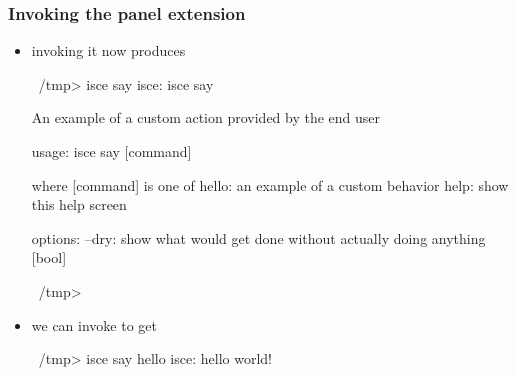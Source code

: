 \begin{frame}[fragile]
%
  \frametitle{Invoking the panel extension}
%
  \begin{itemize}
%
  \item invoking it now produces
%
    \begin{ish}[gobble=4]{}
      ~/tmp> isce say
      isce: isce say

          An example of a custom action provided by the end user

      usage:
          isce say [command]

      where [command] is one of
         hello: an example of a custom behavior
          help: show this help screen

      options:
          --dry: show what would get done without actually doing anything [bool]

      ~/tmp>
    \end{ish}
%
  \item we can invoke  to get
%
    \begin{ish}[firstnumber=16, gobble=4]{}
      ~/tmp> isce say hello
      isce: hello world!
    \end{ish}
%
  \end{itemize}
%
\end{frame}



